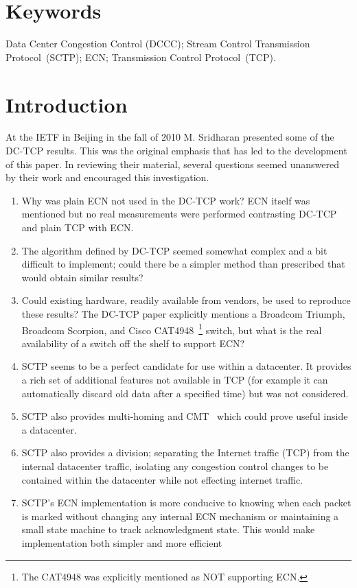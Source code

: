 \documentclass[12pt]{article}
\begin{document}
\section*{Keywords}
Data Center Congestion Control (DCCC);
Stream Control Transmission Protocol~(SCTP);
ECN;
Transmission Control Protocol~(TCP).

\section{Introduction}
At the IETF in Beijing in the fall of 2010 M. Sridharan presented some of the DC-TCP results.
This was the original emphasis that has led to the development of
this paper. In reviewing their material, several questions seemed unanswered by their
work and encouraged this investigation.

\begin{enumerate}
\item Why was plain ECN not used in the DC-TCP work? ECN itself was mentioned but no
real measurements were performed contrasting DC-TCP and plain TCP with ECN.
\item The algorithm defined by DC-TCP seemed somewhat complex and a bit difficult to
implement; could there be a simpler method than prescribed that would obtain similar results?
\item Could existing hardware, readily available from vendors, be used to reproduce these results? The
DC-TCP paper explicitly mentions a  Broadcom Triumph,  Broadcom Scorpion, and Cisco CAT4948~\footnote{The 
CAT4948 was explicitly mentioned as NOT supporting ECN.} switch, but what is the real availability of 
a switch off the shelf to support ECN?

\item SCTP seems to be a perfect candidate for use within a datacenter. It provides a rich set of additional
features not available in TCP (for example it can automatically discard old data after a specified time) but was not 
considered. 

\item SCTP also provides multi-homing and CMT~\cite{jana} which could prove useful inside a datacenter.

\item SCTP also provides a division;  separating the Internet traffic (TCP) from the internal datacenter traffic, isolating
any congestion control changes to be contained within the datacenter while not effecting internet traffic.

\item SCTP's ECN implementation is more conducive to knowing when each packet is marked without
changing any internal ECN mechanism or maintaining a small state machine to track acknowledgment state. 
This would make implementation both simpler and more efficient

\end{enumerate}
\end{document}
